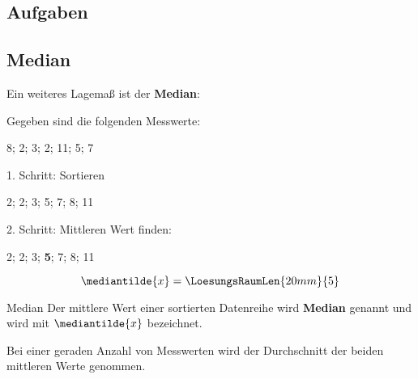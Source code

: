 \subsection*{Aufgaben}

  

  


\newpage

\subsection{Median}

Ein weiteres Lagemaß ist der \textbf{Median}:

Gegeben sind die folgenden Messwerte:




\begin{center}8; 2; 3; 2; 11; 5; 7\end{center}

1. Schritt: Sortieren

\begin{center}2; 2; 3; 5; 7; 8; 11\end{center}

2. Schritt: Mittleren Wert finden:

\begin{center}2; 2; 3; \textbf{5}; 7; 8; 11\end{center}

  $$\mediantilde{x} = \LoesungsRaumLen{20mm}{5}$$
  
\begin{definition}{Median}{}
  Der mittlere Wert einer sortierten Datenreihe wird
  \textbf{Median} genannt und wird mit $\mediantilde{x}$ bezeichnet.

  Bei einer geraden Anzahl von Messwerten wird der Durchschnitt der beiden mittleren Werte genommen.
\end{definition}


